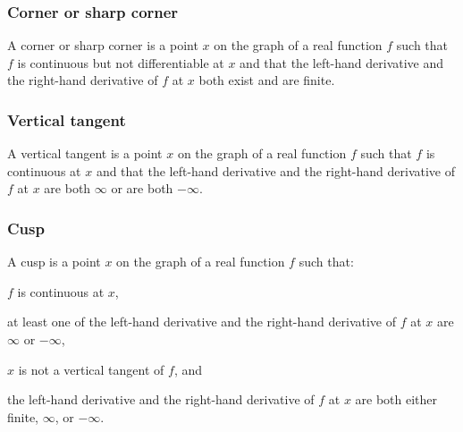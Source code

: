 \subsubsection{Corner or sharp corner}
A corner or sharp corner is a point $x$ on the graph of a real function $f$ such that $f$ is continuous but not differentiable at $x$ and that the left-hand derivative and the right-hand derivative of $f$ at $x$ both exist and are finite.
\subsubsection{Vertical tangent}
A vertical tangent is a point $x$ on the graph of a real function $f$ such that $f$ is continuous at $x$ and that the left-hand derivative and the right-hand derivative of $f$ at $x$ are both $\infty$ or are both $-\infty$.
\subsubsection{Cusp}
A cusp is a point $x$ on the graph of a real function $f$ such that:
\bit
\item $f$ is continuous at $x$,
\item at least one of the left-hand derivative and the right-hand derivative of $f$ at $x$ are $\infty$ or $-\infty$,
\item $x$ is not a vertical tangent of $f$, and
\item the left-hand derivative and the right-hand derivative of $f$ at $x$ are both either finite, $\infty$, or $-\infty$.
\eit
